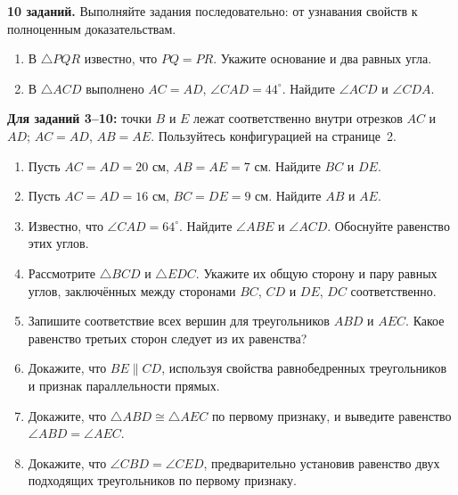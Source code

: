 \documentclass[a4paper,12pt]{article}
\newcommand{\mysection}[1]{\vspace{3pt}\noindent{\large\bfseries\color{darkaccent}#1}\par\vspace{2pt}}
\newcommand{\ang}[1]{\angle #1}
\begin{document}
\mysection{Тренировочный блок --- путь А}
\textbf{10 заданий.} Выполняйте задания последовательно: от узнавания свойств к полноценным доказательствам.

\begin{enumerate}[label=\textbf{\arabic*.},itemsep=11pt]
\item В $\triangle PQR$ известно, что $PQ=PR$. Укажите основание и два равных угла.

\item В $\triangle ACD$ выполнено $AC=AD$, $\ang{CAD}=44^\circ$. Найдите $\ang{ACD}$ и $\ang{CDA}$.
\end{enumerate}

\textbf{Для заданий 3--10:} точки $B$ и $E$ лежат соответственно внутри отрезков $AC$ и $AD$; $AC=AD$, $AB=AE$. Пользуйтесь конфигурацией на странице~2.

\begin{enumerate}[label=\textbf{\arabic*.},start=3,itemsep=11pt]
\item Пусть $AC=AD=20$ см, $AB=AE=7$ см. Найдите $BC$ и $DE$.

\item Пусть $AC=AD=16$ см, $BC=DE=9$ см. Найдите $AB$ и $AE$.

\item Известно, что $\ang{CAD}=64^\circ$. Найдите $\ang{ABE}$ и $\ang{ACD}$. Обоснуйте равенство этих углов.

\item Рассмотрите $\triangle BCD$ и $\triangle EDC$. Укажите их общую сторону и пару равных углов, заключённых между сторонами $BC$, $CD$ и $DE$, $DC$ соответственно.

\item Запишите соответствие всех вершин для треугольников $ABD$ и $AEC$. Какое равенство третьих сторон следует из их равенства?

\item Докажите, что $BE\parallel CD$, используя свойства равнобедренных треугольников и признак параллельности прямых.

\item Докажите, что $\triangle ABD\cong\triangle AEC$ по первому признаку, и выведите равенство $\ang{ABD}=\ang{AEC}$.

\item Докажите, что $\ang{CBD}=\ang{CED}$, предварительно установив равенство двух подходящих треугольников по первому признаку.
\end{enumerate}
\clearpage
\end{document}

